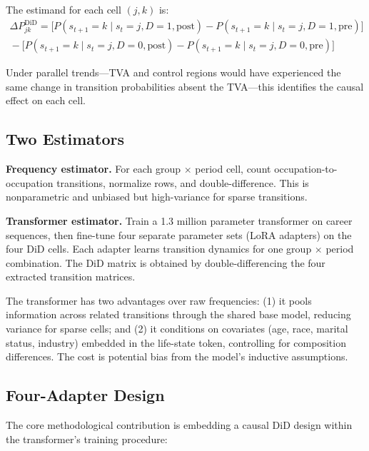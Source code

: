 \documentclass[12pt]{article}
\begin{document}
The estimand for each cell $(j,k)$ is:
\begin{multline}
\Delta P_{jk}^{\text{DiD}} = \bigl[P(s_{t+1} = k \mid s_t = j, D=1, \text{post}) - P(s_{t+1} = k \mid s_t = j, D=1, \text{pre})\bigr] \\
{} - \bigl[P(s_{t+1} = k \mid s_t = j, D=0, \text{post}) - P(s_{t+1} = k \mid s_t = j, D=0, \text{pre})\bigr]
\end{multline}

Under parallel trends---TVA and control regions would have experienced the same change in transition probabilities absent the TVA---this identifies the causal effect on each cell.

\subsection{Two Estimators}

\textbf{Frequency estimator.} For each group $\times$ period cell, count occupation-to-occupation transitions, normalize rows, and double-difference. This is nonparametric and unbiased but high-variance for sparse transitions.

\textbf{Transformer estimator.} Train a 1.3 million parameter transformer on career sequences, then fine-tune four separate parameter sets (LoRA adapters) on the four DiD cells. Each adapter learns transition dynamics for one group $\times$ period combination. The DiD matrix is obtained by double-differencing the four extracted transition matrices.

The transformer has two advantages over raw frequencies: (1) it pools information across related transitions through the shared base model, reducing variance for sparse cells; and (2) it conditions on covariates (age, race, marital status, industry) embedded in the life-state token, controlling for composition differences. The cost is potential bias from the model's inductive assumptions.

\subsection{Four-Adapter Design}

The core methodological contribution is embedding a causal DiD design within the transformer's training procedure:
\end{document}
